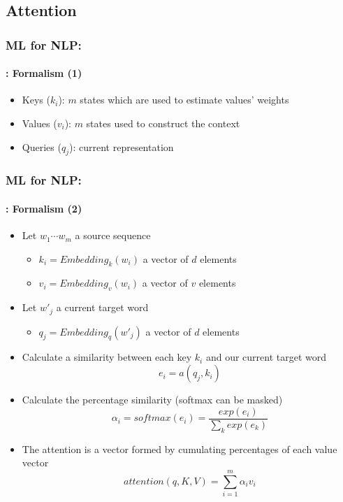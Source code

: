 \documentclass[xcolor=table]{beamer}
\begin{document}
	\subsection{Attention}
	
	\begin{frame}
		\frametitle{ML for NLP: \insertsection}
		\framesubtitle{\insertsubsection: Formalism (1)}
		
		\begin{center}
		\end{center}
		
		\vskip-6pt
		\begin{itemize}
			\item Keys ($k_i$): $m$ states which are used to estimate values' weights
			\item Values ($v_i$): $m$ states used to construct the context 
			\item Queries ($q_j$): current representation 
		\end{itemize}
		
	\end{frame}

	\begin{frame}
		\frametitle{ML for NLP: \insertsection}
		\framesubtitle{\insertsubsection: Formalism (2)}
		
		\begin{itemize}
			\item Let $ w_1 \cdots w_m $ a source sequence
			\begin{itemize}
				\item $ k_i =  Embedding_k(w_i)$ a vector of $ d $ elements
				\item $ v_i =  Embedding_v(w_i)$ a vector of $ v $ elements
			\end{itemize}
			\item Let $ w'_j $ a current target word
			\begin{itemize}
				\item $ q_j =  Embedding_q(w'_j)$ a vector of $ d $ elements
			\end{itemize}
			\item Calculate a similarity between each key $ k_i $ and our current target word 
			\[e_i = a(q_j, k_i)\]
			\item Calculate the percentage similarity (softmax can be masked)
			\[\alpha_i = softmax(e_i) = \frac{exp(e_i)}{\sum_k exp(e_k)}\] 
			\item The attention is a vector formed by cumulating percentages of each value vector
			\vspace{-6pt}\[attention(q, K, V) = \sum_{i=1}^{m} \alpha_i v_i\]
		\end{itemize}
	\end{frame}
	
\end{document}
